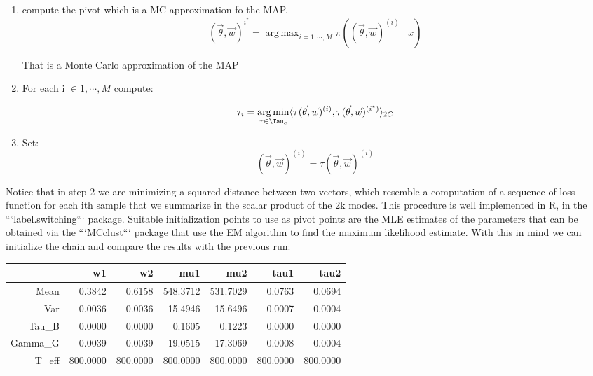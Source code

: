 \documentclass{article}
\DeclareMathOperator*{\argmax}{arg\,max}  %
\DeclareMathOperator*{\argmin}{arg\,min}
\begin{document}
\begin{enumerate}
\item compute the pivot which is a MC approximation fo the MAP.
\begin{equation}
    (\vec \theta, \vec w)^{i^{\ast}} = \argmax_{i=1, \cdots, M} \pi( (\vec \theta, \vec w)^{(i)} \mid x)
\end{equation}

That is a Monte Carlo approximation of the MAP
\item For each i $\in 1,\cdots, M$ compute:

\begin{equation}
\tau_i = \argmin_{\tau \in \Tau_c} \langle \tau (\vec \theta, \vec w)^{(i)}, \tau (\vec \theta, \vec w)^{(i^{\ast})}\rangle_{2C} 
\end{equation}

\item  Set:
\begin{equation}
(\vec \theta, \vec w)^{(i)} =  \tau(\vec \theta, \vec w)^{(i)}
\end{equation}
\end{enumerate}

Notice that in step 2 we are minimizing a squared distance between two vectors, which resemble a computation of a sequence of loss function for each ith sample that we summarize in the scalar product of the 2k modes. This procedure is well implemented in R, in the ```label.switching``` package. Suitable initialization points to use as pivot points are the MLE estimates of the parameters that can be obtained via the ```MCclust``` package that use the EM algorithm to find the maximum likelihood estimate. With this in mind we can initialize the chain and compare the results with the previous run:

\begin{table}[ht]
\centering
\begin{tabular}{rrrrrrr}
  \hline
 & w1 & w2 & mu1 & mu2 & tau1 & tau2 \\ 
  \hline
Mean & 0.3842 & 0.6158 & 548.3712 & 531.7029 & 0.0763 & 0.0694 \\ 
  Var & 0.0036 & 0.0036 & 15.4946 & 15.6496 & 0.0007 & 0.0004 \\ 
  Tau\_B & 0.0000 & 0.0000 & 0.1605 & 0.1223 & 0.0000 & 0.0000 \\ 
  Gamma\_G & 0.0039 & 0.0039 & 19.0515 & 17.3069 & 0.0008 & 0.0004 \\ 
  T\_eff & 800.0000 & 800.0000 & 800.0000 & 800.0000 & 800.0000 & 800.0000 \\ 
   \hline
\end{tabular}
\end{table}
\end{document}
